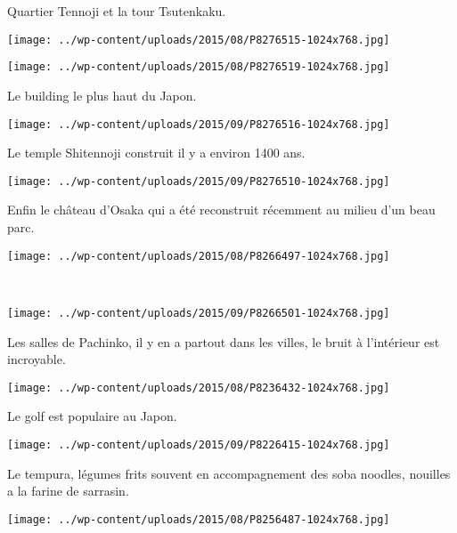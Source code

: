  Quartier Tennoji et la tour Tsutenkaku.
\begin{center} \texttt{[image: ../wp-content/uploads/2015/08/P8276515-1024x768.jpg]} \end{center}
\begin{center} \texttt{[image: ../wp-content/uploads/2015/08/P8276519-1024x768.jpg]} \end{center}

 Le building le plus haut du Japon.
\begin{center} \texttt{[image: ../wp-content/uploads/2015/09/P8276516-1024x768.jpg]} \end{center}
\vspace{-\topsep}
\pagebreak
 
 Le temple Shitennoji construit il y a environ 1400 ans.
\begin{center} \texttt{[image: ../wp-content/uploads/2015/09/P8276510-1024x768.jpg]} \end{center}

  Enfin le château d'Osaka qui a été reconstruit récemment au milieu d'un beau parc.
\begin{center} \texttt{[image: ../wp-content/uploads/2015/08/P8266497-1024x768.jpg]} \end{center}
\vspace{-\topsep}
\pagebreak

~
\vspace{0.75mm}
\begin{center} \texttt{[image: ../wp-content/uploads/2015/09/P8266501-1024x768.jpg]} \end{center}

 Les salles de Pachinko, il y en a partout dans les villes, le bruit à l'intérieur est incroyable. 
\begin{center} \texttt{[image: ../wp-content/uploads/2015/08/P8236432-1024x768.jpg]} \end{center}
\vspace{-\topsep}
\pagebreak
 
 Le golf est populaire au Japon.
 \vspace{1.75mm}
\begin{center} \texttt{[image: ../wp-content/uploads/2015/09/P8226415-1024x768.jpg]} \end{center}

 Le tempura, légumes frits souvent en accompagnement des soba noodles, nouilles a la farine de sarrasin. 
\begin{center} \texttt{[image: ../wp-content/uploads/2015/08/P8256487-1024x768.jpg]} \end{center}
\vspace{-\topsep}
\pagebreak

